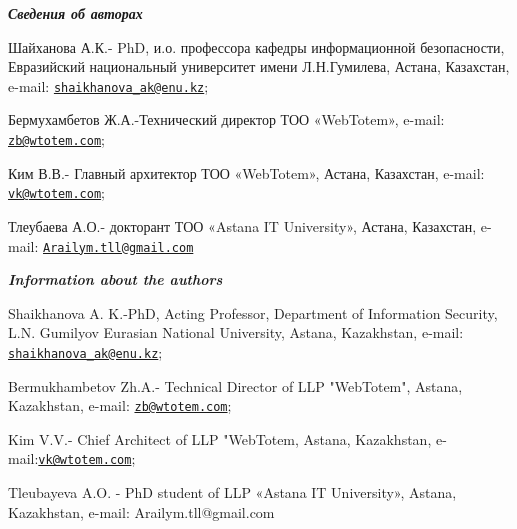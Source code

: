 \begin{authorinfo}
\emph{{\bfseries Сведения об авторах}}

Шайханова А.К.- PhD, и.о. профессора кафедры информационной
безопасности, Евразийский национальный университет имени Л.Н.Гумилева,
Астана, Казахстан, e-mail:
\href{mailto:shaikhanova_ak@enu.kz}{\nolinkurl{shaikhanova\_ak@enu.kz}};

Бермухамбетов Ж.А.-Технический директор ТОО «WebTotem», e-mail:
\href{mailto:zb@wtotem.com}{\nolinkurl{zb@wtotem.com}};

Ким В.В.- Главный архитектор ТОО «WebTotem», Астана, Казахстан, e-mail:
\href{mailto:vk@wtotem.com}{\nolinkurl{vk@wtotem.com}};

Тлеубаева А.О.- докторант ТОО «Astana IT University», Астана, Казахстан,
e-mail:
\href{mailto:Arailym.tll@gmail.com}{\nolinkurl{Arailym.tll@gmail.com}}

\emph{{\bfseries Information about the authors}}

Shaikhanova A. K.-PhD, Acting Professor, Department of Information
Security, L.N. Gumilyov Eurasian National University, Astana,
Kazakhstan, e-mail:
\href{mailto:shaikhanova_ak@enu.kz}{\nolinkurl{shaikhanova\_ak@enu.kz}};

Bermukhambetov Zh.A.- Technical Director of LLP "WebTotem", Astana,
Kazakhstan, e-mail:
\href{mailto:zb@wtotem.com}{\nolinkurl{zb@wtotem.com}};

Kim V.V.- Chief Architect of LLP "WebTotem, Astana, Kazakhstan,
e-mail:\href{mailto:vk@wtotem.com}{\nolinkurl{vk@wtotem.com}};

Tleubayeva A.O. - PhD student of LLP «Astana IT University», Astana,
Kazakhstan, e-mail: Arailym.tll@gmail.com
\end{authorinfo}
